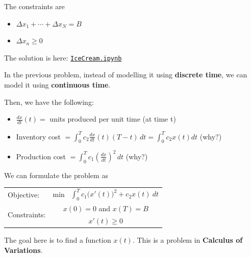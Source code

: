 \begin{solution}
\begin{slide}
\begin{parts}
\item The constraints are
\begin{itemize}
	\item $\Delta x_1 + \cdots + \Delta x_N = B$
	\item $\Delta x_n \geq 0$
\end{itemize}

	
\item The solution is here: \href{https://utoronto.syzygy.ca/jupyter/user-redirect/git-pull?repo=https://github.com/bigfatbernie/IBLMathModeling&subPath=book/python/IceCream.ipynb}{\tt IceCream.ipynb}


\end{parts}

\end{slide}
\end{solution}






\begin{slide}
\question \label{q:cv}

In the previous problem, instead of modelling it using \textbf{discrete time}, we can model it using \textbf{continuous time}.

Then, we have the following:
\begin{itemize}
	\item $\frac{dx}{dt}(t) = $ units produced per unit time (at time t)
	\item Inventory cost $\displaystyle= \int_0^T c_2 \frac{dx}{dt}(t) (T-t) \, dt = \int_0^T c_2 x(t) dt$ \hfill (why?)
	\item Production cost $\displaystyle= \int_0^T c_1 \left(\frac{dx}{dt}\right)^2 \, dt$
		\hfill (why?)
\end{itemize}
We can formulate the problem as
\begin{problem}
\begin{tabular}[t]{lc}
	Objective: 						& min \ $\displaystyle\int_0^T c_1 \big(x'(t)\big)^2 + c_2 x(t) ~dt$ \\[10pt]
	\multirow{2}{*}{Constraints:} 	& $x(0)=0$ and $x(T)=B$ \\
				& $x'(t) \geq 0$
\end{tabular}

The goal here is to find a function $x(t)$. This is a problem in \textbf{Calculus of Variations}.
\end{problem}


\end{slide}



